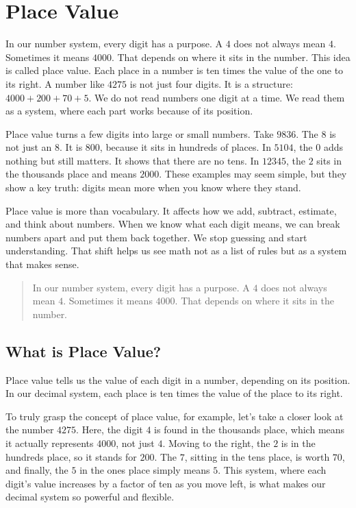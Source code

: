 

\section{Place Value}

In our number system, every digit has a purpose. A \(4\) does not always mean \(4\).
Sometimes it means \(4000\). That depends on where it sits in the number. This idea
is called place value. Each place in a number is ten times the value of the one to
its right. A number like \(4275\) is not just four digits. It is a structure:
\(4000 + 200 + 70 + 5\). We do not read numbers one digit at a time. We read them
as a system, where each part works because of its position.

Place value turns a few digits into large or small numbers. Take \(9836\). The \(8\)
is not just an \(8\). It is \(800\), because it sits in hundreds of places. In
\(5104\), the \(0\) adds nothing but still matters. It shows that there are no
tens. In \(12345\), the \(2\) sits in the thousands place and means \(2000\). These
examples may seem simple, but they show a key truth: digits mean more when you know
where they stand.

Place value is more than vocabulary. It affects how we add, subtract, estimate, and
think about numbers. When we know what each digit means, we can break numbers apart
and put them back together. We stop guessing and start understanding. That shift
helps us see math not as a list of rules but as a system that makes sense.

\blockquote{In our number system, every digit has a purpose. A \(4\) does not always
mean \(4\). Sometimes it means \(4000\). That depends on where it sits in the
number.}

\subsection{What is Place Value?}

Place value tells us the value of each digit in a number, depending on its
position. In our decimal system, each place is ten times the value of the place to
its right.

To truly grasp the concept of place value, for example, let's take a closer look at the number
\(4275\). Here, the digit \(4\) is found in the thousands place, which means it
actually represents \(4000\), not just \(4\). Moving to the right, the \(2\) is in
the hundreds place, so it stands for \(200\). The \(7\), sitting in the tens
place, is worth \(70\), and finally, the \(5\) in the ones place simply means
\(5\). This system, where each digit's value increases by a factor of ten as you
move left, is what makes our decimal system so powerful and flexible.

